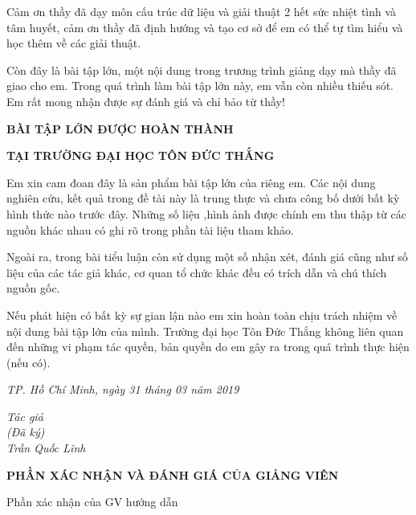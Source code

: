 \documentclass{report}
\begin{document}
\changefontsizes{13pt}
\bigskip
\setlength{\parindent}{2cm}

Cảm ơn thầy đã dạy môn cấu trúc dữ liệu và giải thuật 2 hết sức nhiệt tình và tâm huyết, cảm ơn thầy đã định hướng và tạo cơ sở để em có thể tự tìm hiểu và học thêm về các giải thuật.

Còn đây là bài tập lớn, một nội dung trong trương trình giảng dạy mà thầy đã giao cho em. Trong quá trình làm bài tập lớn này, em vẫn còn nhiều thiếu sót. Em rất mong nhận được sự đánh giá và chỉ bảo từ thầy!
    
\newpage
\changefontsizes{16pt}
\centerline{\textbf{BÀI TẬP LỚN ĐƯỢC HOÀN THÀNH}}
\centerline{\textbf{TẠI TRƯỜNG ĐẠI HỌC TÔN ĐỨC THẮNG}}
\changefontsizes{13pt}
\vspace{1cm}
\setlength{\parindent}{2cm}
Em xin cam đoan đây là sản phẩm bài tập lớn của riêng em. Các nội dung nghiên cứu, kết quả trong đề tài này là trung thực và chưa công bố dưới bất kỳ hình thức nào trước đây. Những số liệu ,hình ảnh được chính em thu thập từ các nguồn khác nhau có ghi rõ trong phần tài liệu tham khảo.

\setlength{\parindent}{2cm}
Ngoài ra, trong bài tiểu luận còn sử dụng một số nhận xét, đánh giá cũng như số liệu của các tác giả khác, cơ quan tổ chức khác đều có trích dẫn và chú thích nguồn gốc.

\setlength{\parindent}{2cm}
Nếu phát hiện có bất kỳ sự gian lận nào em xin hoàn toàn chịu trách nhiệm về nội dung bài tập lớn của mình. Trường đại học Tôn Đức Thắng không liên quan đến những vi phạm tác quyền, bản quyền do em gây ra trong quá trình thực hiện (nếu có).

\vspace{0.75cm}
\begin{flushright}
\renewcommand{\baselinestretch}{0.05}
\changefontsizes{13pt}
\textit{TP. Hồ Chí Minh, ngày 31 tháng 03 năm 2019}
\end{flushright}

\setlength{\parindent}{12cm}
\textit{Tác giả }\\

\setlength{\parindent}{12cm}
\textit{(Đã ký)}\\

\setlength{\parindent}{11.25cm}
\textit{Trần Quốc Lĩnh}\\



\newpage
\changefontsizes{16pt}
\centerline{\textbf{PHẦN XÁC NHẬN VÀ ĐÁNH GIÁ CỦA GIẢNG VIÊN}}
\bigskip
\changefontsizes{13pt}
\setlength{\parindent}{2.2cm}
Phần xác nhận của GV hướng dẫn
\end{document}
